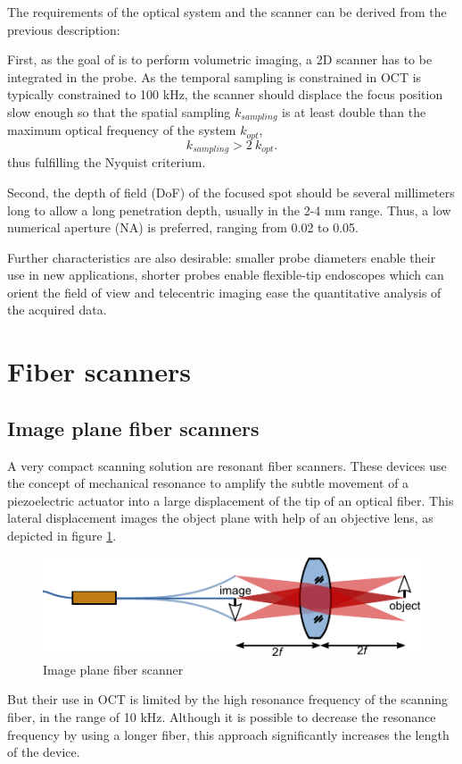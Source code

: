 \documentclass[10pt]{iopart}
\begin{document}
The requirements of the optical system and the scanner can be derived from the previous description: 

First, as the goal of is to perform volumetric imaging, a 2D scanner has to be integrated in the probe. As the temporal sampling is constrained in OCT is typically constrained to 100 kHz, the scanner should displace the focus position slow enough so that the spatial sampling $k_{sampling}$ is at least double than the maximum optical frequency of the system $k_{opt}$,
\begin{equation}
k_{sampling} > 2 \ k_{opt}.
\end{equation}
thus fulfilling the Nyquist criterium.


Second, the depth of field (DoF) of the focused spot should be several millimeters long to allow a long penetration depth, usually in the 2-4 mm range. Thus, a low numerical aperture (NA) is preferred, ranging from 0.02 to 0.05.

Further characteristics are also desirable: smaller probe diameters enable their use in new applications, shorter probes enable flexible-tip endoscopes which can orient the field of view and telecentric imaging ease the quantitative analysis of the acquired data.


\section{Fiber scanners}
\subsection{Image plane fiber scanners}
A very compact scanning solution are resonant fiber scanners. These devices use the concept of mechanical resonance to amplify the subtle movement of a piezoelectric actuator into a large displacement of the tip of an optical fiber. This lateral displacement images the object plane with help of an objective lens, as depicted in figure \ref{fig:fiberScanner}.
\begin{figure}[h!]\centering \includegraphics{figures/fiberScanner.pdf}
      \caption{Image plane fiber scanner}
      \label{fig:fiberScanner}
\end{figure}
But their use in OCT is limited by the high resonance frequency of the scanning fiber, in the range of 10 kHz. Although it is possible to decrease the resonance frequency by using a longer fiber, this approach significantly increases the length of the device.
\end{document}
